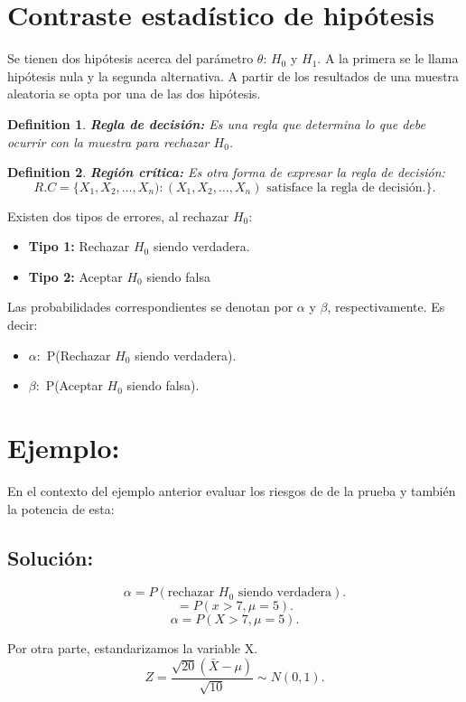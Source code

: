 \documentclass{article}
\newtheorem{mydef}{Definition}
\begin{document}
\section{Contraste estadístico de hipótesis}
Se tienen dos hipótesis acerca del parámetro $\theta$: $H_{0}$ y $H_{1}$. A la primera se le llama hipótesis nula y la segunda alternativa. A partir de los resultados de una muestra aleatoria se opta por una de las dos hipótesis.

\begin{mydef}
\textbf{Regla de decisión:} Es una regla que determina lo que debe ocurrir con la muestra para rechazar $H_{0}$.
\end{mydef}

\begin{mydef}
\textbf{Región crítica:} Es otra forma de expresar la regla de decisión:
\[ R.C = \{X_{1},X_{2},\ldots,X_{n}):(X_{1},X_{2},\ldots,X_{n}) \text{ satisface la regla de decisión.}\}.\]
\end{mydef}

Existen dos tipos de errores, al rechazar $H_{0}$:
\begin{itemize}
	\item \textbf{Tipo 1:} Rechazar $H_{0}$ siendo verdadera.
	\item \textbf{Tipo 2:} Aceptar $H_{0}$ siendo falsa
\end{itemize}

Las probabilidades correspondientes se denotan por $\alpha$ y $\beta$, respectivamente. Es decir:
\begin{itemize}
	\item $\alpha:$ P(Rechazar $H_{0}$ siendo verdadera).
	\item $\beta:$ P(Aceptar $H_{0}$ siendo falsa).
\end{itemize}

\section{Ejemplo:}
En el contexto del ejemplo anterior evaluar los riesgos de de la prueba y también la potencia de esta:

\subsection{Solución:}
\[ \alpha=P{(\text{rechazar $H_{0}$ siendo verdadera})}.\]
\[ =P{(x>7,\mu=5)}.\]
\[ \alpha=P{(X>7,\mu=5)}.\]

Por otra parte, estandarizamos la variable X.
\[ Z=\frac{\sqrt{20}{(\bar{X}-\mu)}}{\sqrt{10}}\sim N{(0,1)}.\]
\end{document}
